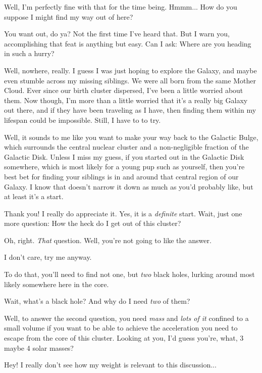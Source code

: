 \Sterope Well, I'm perfectly fine with that for the time being.  Hmmm... How do you suppose I might find my way out of here?

\Enrico You want out, do ya?  Not the first time I've heard that.  But I warn you, accomplishing that feat is anything but easy.  Can I ask:  Where are you heading in such a hurry?

\Sterope Well, nowhere, really.  I guess I was just hoping to explore the Galaxy, and maybe even stumble across my missing siblings.  We were all born from the same Mother Cloud.  Ever since our birth cluster dispersed, I've been a little worried about them.  Now though, I'm more than a little worried that it's a really big Galaxy out there, and if they have been traveling as I have, then finding them within my lifespan could be impossible.  Still, I have to to try.

\Enrico Well, it sounds to me like you want to make your way back to the Galactic Bulge, which surrounds the central nuclear cluster and a non-negligible fraction of the Galactic Disk.  Unless I miss my guess, if you started out in the Galactic Disk somewhere, which is most likely for a young pup such as yourself, then you're best bet for finding your siblings is in and around that central region of our Galaxy.  I know that doesn't narrow it down as much as you'd probably like, but at least it's a start.

\Sterope Thank you!  I really do appreciate it.  Yes, it is a \textit{definite} start.  Wait, just one more question:  How the heck do I get out of this cluster?

\Enrico Oh, right.  \textit{That} question.  Well, you're not going to like the answer.

\Sterope I don't care, try me anyway.

\Enrico To do that, you'll need to find not one, but \textit{two} black holes, lurking around most likely somewhere here in the core.  

\Sterope Wait, what's a black hole?  And why do I need \textit{two} of them?

\Enrico Well, to answer the second question, you need \textit{mass} and \textit{lots of it} confined to a small volume if you want to be able to achieve the acceleration you need to escape from the core of this cluster.  Looking at you, I'd guess you're, what, 3 maybe 4 solar masses?

\Sterope Hey! I really don't see how my weight is relevant to this discussion...


